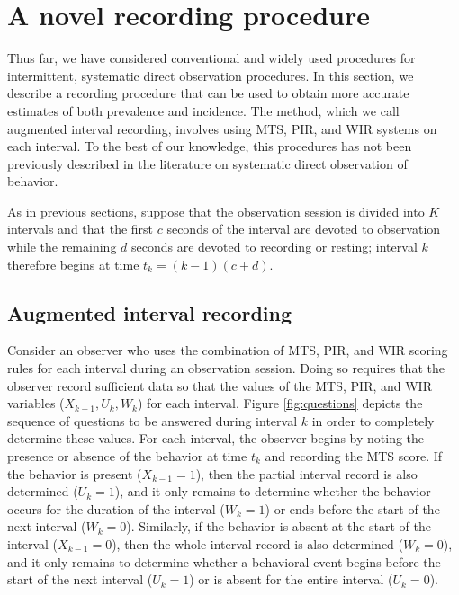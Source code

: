 \documentclass[man, noextraspace, floatsintext]{apa6}\usepackage[]{graphicx}\usepackage[]{color}
\begin{document}
\section{A novel recording procedure}

Thus far, we have considered conventional and widely used procedures for intermittent, systematic direct observation procedures. 
In this section, we describe a recording procedure that can be used to obtain more accurate estimates of both prevalence and incidence. 
The method, which we call augmented interval recording, involves using MTS, PIR, and WIR systems on each interval. To the best of our knowledge, this procedures has not been previously described in the literature on systematic direct observation of behavior. 

As in previous sections, suppose that the observation session is divided into $K$ intervals and that the first $c$ seconds of the interval are devoted to observation while the remaining $d$ seconds are devoted to recording or resting; interval $k$ therefore begins at time $t_k = (k - 1)(c + d)$. 

\subsection{Augmented interval recording}

Consider an observer who uses the combination of MTS, PIR, and WIR scoring rules for each interval during an observation session. 
Doing so requires that the observer record sufficient data so that the values of the MTS, PIR, and WIR variables ($X_{k-1},U_k,W_k$) for each interval. 
Figure \ref{fig:questions} depicts the sequence of questions to be answered during interval $k$ in order to completely determine these values. 
For each interval, the observer begins by noting the presence or absence of the behavior at time $t_k$ and recording the MTS score. 
If the behavior is present ($X_{k-1} = 1$), then the partial interval record is also determined ($U_k = 1$), and it only remains to determine whether the behavior occurs for the duration of the interval ($W_k = 1$) or ends before the start of the next interval ($W_k = 0$). 
Similarly, if the behavior is absent at the start of the interval ($X_{k-1} = 0$), then the whole interval record is also determined ($W_k = 0$), and it only remains to determine whether a behavioral event begins before the start of the next interval ($U_k = 1$) or is absent for the entire interval ($U_k = 0$). 
\end{document}
